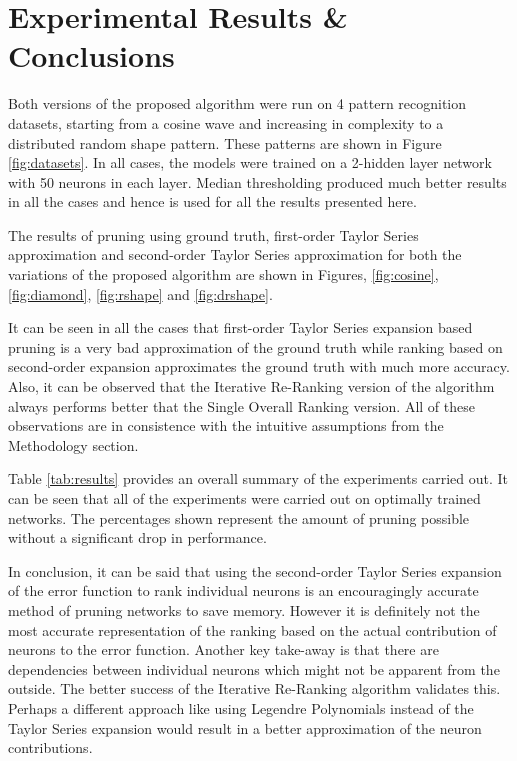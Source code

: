 \section{Experimental Results \& Conclusions}

Both versions of the proposed algorithm were run on 4 pattern recognition datasets, starting from a cosine wave and increasing in complexity to a distributed random shape pattern. These patterns are shown in Figure \ref{fig:datasets}. In all cases, the models were trained on a 2-hidden layer network with 50 neurons in each layer. Median thresholding produced much better results in all the cases and hence is used for all the results presented here.

The results of pruning using ground truth, first-order Taylor Series approximation and second-order Taylor Series approximation for both the variations of the proposed algorithm are shown in Figures, \ref{fig:cosine}, \ref{fig:diamond}, \ref{fig:rshape} and \ref{fig:drshape}.

It can be seen in all the cases that first-order Taylor Series expansion based pruning is a very bad approximation of the ground truth while ranking based on second-order expansion approximates the ground truth with much more accuracy. Also, it can be observed that the Iterative Re-Ranking version of the algorithm always performs better that the Single Overall Ranking version. All of these observations are in consistence with the intuitive assumptions from the Methodology section. 

Table \ref{tab:results} provides an overall summary of the experiments carried out. It can be seen that all of the experiments were carried out on optimally trained networks. The percentages shown represent the amount of pruning possible without a significant drop in performance.

In conclusion, it can be said that using the second-order Taylor Series expansion of the error function to rank individual neurons is an encouragingly accurate method of pruning networks to save memory. However it is definitely not the most accurate representation of the ranking based on the actual contribution of neurons to the error function. Another key take-away is that there are dependencies between individual neurons which might not be apparent from the outside. The better success of the Iterative Re-Ranking algorithm validates this. Perhaps a different approach like using Legendre Polynomials instead of the Taylor Series expansion would result in a better approximation of the neuron contributions.


